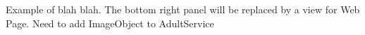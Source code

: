 \label{fig:ldviews}
Example of blah blah. The bottom right panel will be replaced by a view for Web Page. Need to add ImageObject to AdultService